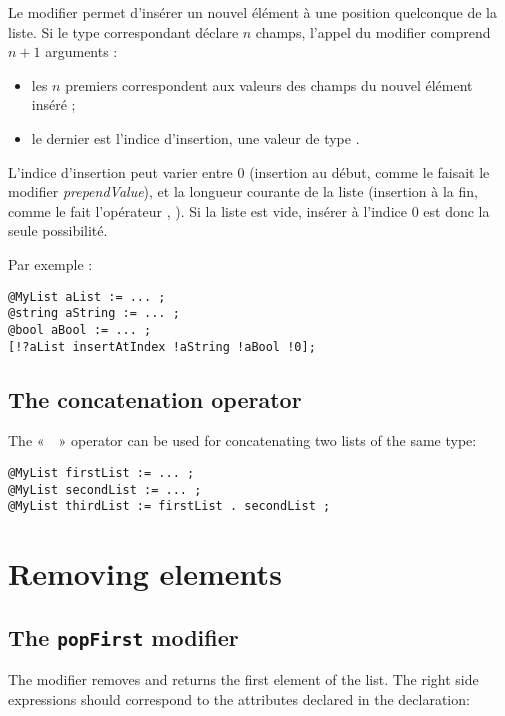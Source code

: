 Le modifier  permet d'insérer un nouvel élément à une position quelconque de la liste. Si le type  correspondant déclare $n$ champs, l'appel du modifier comprend $n+1$ arguments :
\begin{itemize}
  \item les $n$ premiers correspondent aux valeurs des champs du nouvel élément inséré ;
  \item le dernier est l'indice d'insertion, une valeur de type .
\end{itemize}

L'indice d'insertion peut varier entre $0$ (insertion au début, comme le faisait le modifier \emph{prependValue}), et la longueur courante de la liste (insertion à la fin, comme le fait l'opérateur \galgas{+=}, ). Si la liste est vide, insérer à l'indice $0$ est donc la seule possibilité.

Par exemple :

\begin{lstlisting}[language=galgas]
@MyList aList := ... ;
@string aString := ... ;
@bool aBool := ... ;
[!?aList insertAtIndex !aString !aBool !0];
\end{lstlisting}

\subsection{The concatenation operator}

The «~~» operator can be used for concatenating two lists of the same type:


\begin{lstlisting}[language=galgas]
@MyList firstList := ... ;
@MyList secondList := ... ;
@MyList thirdList := firstList . secondList ;
\end{lstlisting}

\section{Removing elements}

\subsection{The \texttt{popFirst} modifier}


The  modifier removes and returns the first element of the list. The right side expressions should correspond to the attributes declared in the  declaration:\\

